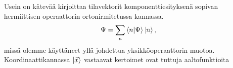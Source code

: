 \documentclass[a4paper, finnish]{article}
\begin{document}
Usein on kätevää kirjoittaa tilavektorit komponenttiesityksenä sopivan hermiittisen operaattorin ortonirmitetussa kannassa.
\begin{equation*}
\Psi = \sum_n \braket{n|\Psi}\ket{n},
\end{equation*}
missä olemme käyttäneet yllä johdettua yksikköoperaattorin muotoa. Koordinaattikannassa $\ket{\vec{x}}$ vastaavat kertoimet ovat tuttuja aaltofunktioita
\begin{equation*}

\end{equation*}
 
\end{document}
